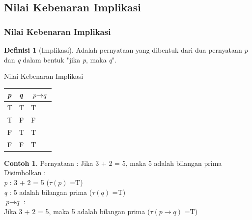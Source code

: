 \documentclass[handout]{beamer}
\theoremstyle{definition}
\newtheorem{definisi}[theorem]{Definisi}
\theoremstyle{example}
\newtheorem{contoh}[theorem]{Contoh}
\begin{document}
\subsection{Nilai Kebenaran Implikasi}
\begin{frame}[shrink]
	\frametitle{Nilai Kebenaran Implikasi}
	\begin{definisi}[Implikasi]
		
		Adalah pernyataan yang dibentuk dari dua pernyataan \textit{p} dan \textit{q} dalam bentuk "jika \textit{p}, maka \textit{q}".     	
	\end{definisi}
	\begin{block}{Nilai Kebenaran Implikasi}
		\begin{tabular}{ | l | l | l | }
			\hline
			\textit{p} & \textit{q} & $\textit{p}\rightarrow\textit{q}$ \\ \hline
			T & T & T \\ \hline
			T & F & F \\ \hline
			F & T & T \\ \hline
			F & F & T \\     		 
			\hline
		\end{tabular}
	\end{block}
	\begin{contoh}
		Pernyataan : Jika 3 + 2 = 5, maka 5 adalah bilangan prima
		\\
		Disimbolkan :\\
		\textit{p} : 3 + 2 = 5 ($\tau(\textit{p})$ =T)\\
		\textit{q} : 5 adalah bilangan prima ($\tau(\textit{q})$ =T)\\
		$\textit{p}\rightarrow\textit{q}$ : \\Jika 3 + 2 = 5, maka 5 adalah bilangan prima ($\tau(\textit{p}\rightarrow\textit{q})$ =T)	
	\end{contoh}
\end{frame}
\end{document}
